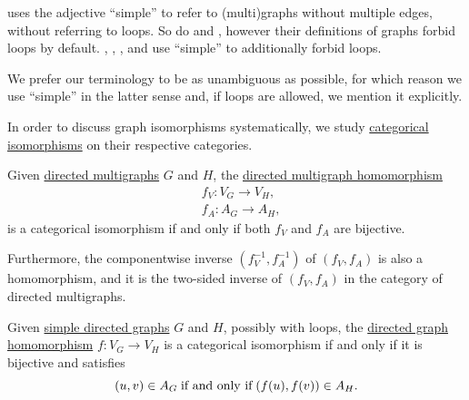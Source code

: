 \begin{remark}
   uses the adjective \enquote{simple} to refer to (multi)graphs without multiple edges, without referring to loops. So do  and , however their definitions of graphs forbid loops by default. , , ,  and  use \enquote{simple} to additionally forbid loops.

  We prefer our terminology to be as unambiguous as possible, for which reason we use \enquote{simple} in the latter sense and, if loops are allowed, we mention it explicitly.
\end{remark}

\begin{proposition}\label{thm:graph_isomorphisms}
  In order to discuss graph isomorphisms systematically, we study \hyperref[def:morphism_invertibility/isomorphism]{categorical isomorphisms} on their respective categories.

  \begin{thmenum}
     Given \hyperref[def:directed_multigraph]{directed multigraphs} \( G \) and \( H \), the \hyperref[def:directed_multigraph/homomorphism]{directed multigraph homomorphism}
    \begin{align*}
      &f_V: V_G \to V_H, \\
      &f_A: A_G \to A_H,
    \end{align*}
    is a categorical isomorphism if and only if both \( f_V \) and \( f_A \) are bijective.

    Furthermore, the componentwise inverse \( (f_V^{-1}, f_A^{-1}) \) of \( (f_V, f_A) \) is also a homomorphism, and it is the two-sided inverse of \( (f_V, f_A) \) in the category of directed multigraphs.

     Given \hyperref[def:directed_graph]{simple directed graphs} \( G \) and \( H \), possibly with loops, the \hyperref[def:directed_graph/homomorphism]{directed graph homomorphism} \( f: V_G \to V_H \) is a categorical isomorphism if and only if it is bijective and satisfies
    \begin{equation}\label{eq:thm:graph_isomorphisms/simple_directed}
      (u, v) \in A_G \T{if and only if} (f(u), f(v)) \in A_H.
    \end{equation}


\end{thmenum}
\end{proposition}
